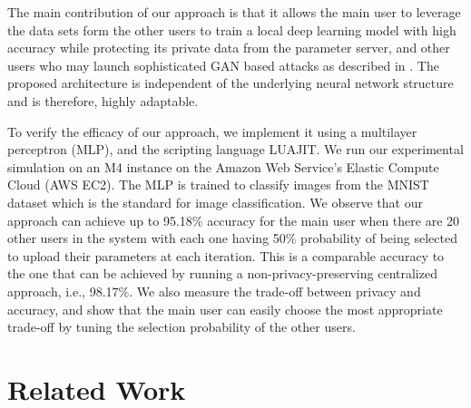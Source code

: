 \documentclass[conference]{IEEEtran}
\begin{document}
The main contribution of our approach is that it allows the main user to leverage the data sets form the other users to train a local
deep learning model with high accuracy while protecting its private data from the parameter server, and other users who
may launch sophisticated GAN based attacks as described in \cite{hitaj2017deep}. The proposed architecture is independent of the
underlying neural network structure and is therefore, highly adaptable.


To verify the efficacy of our approach, we implement it using a multilayer perceptron (MLP), and the scripting language
LUAJIT. We run our experimental simulation on an M4 instance on the Amazon Web Service's Elastic Compute Cloud (AWS EC2). The MLP is trained to 
classify images from the MNIST dataset which is the standard for image classification.
We observe that our approach can achieve up to 95.18\%  accuracy for the main user when there are 20 other users in the
system with each one having 50\% probability of being selected to upload their parameters at each iteration. 
This is a comparable accuracy to the one that can be achieved by running a non-privacy-preserving centralized approach, i.e.,  98.17\%.
We also measure the trade-off between privacy and accuracy, and show that the main user can easily choose the most appropriate
trade-off by tuning the selection probability of the other users. 


\section{Related Work}
\end{document}
